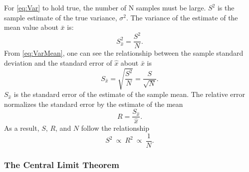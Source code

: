 For \eqref{eq:Var} to hold true, the number of N samples must be large.
$S^2$ is the sample estimate of the true variance, $\sigma^2$.
The variance of the estimate of the mean value about $\bar{x}$ is:
\begin{equation}
S^{ 2 }_{ \hat { x }  }=\frac{S^2}{N}.
\label{eq:VarMean}
\end{equation}
From \eqref{eq:VarMean}, one can see the relationship between the sample standard
deviation and the standard error of $\hat{x}$ about $\bar{x}$ is
\begin{equation}
S_{ \hat { x }  }=\sqrt { \frac { S^{ 2 } }{ N }  } =\frac { S }{ \sqrt { N }}.
\label{eq:VarN}
\end{equation}
$S_{\hat{x}}$ is the standard error of the estimate of the sample mean.
The relative error normalizes the standard error by the estimate of the mean
\begin{equation}
R = \frac{S_{ \hat { x }  }}{\hat{x}} .
\label{eq:RelativeErr}
\end{equation}
As a result, $S$, $R$, and $N$ follow the relationship
\begin{equation}
S^2\:\propto\: R^2\:\propto\:\frac{1}{N} .
\label{eq:S to R}
\end{equation}

\subsubsection{The Central Limit Theorem}
\label{subsubsec:CLT}

